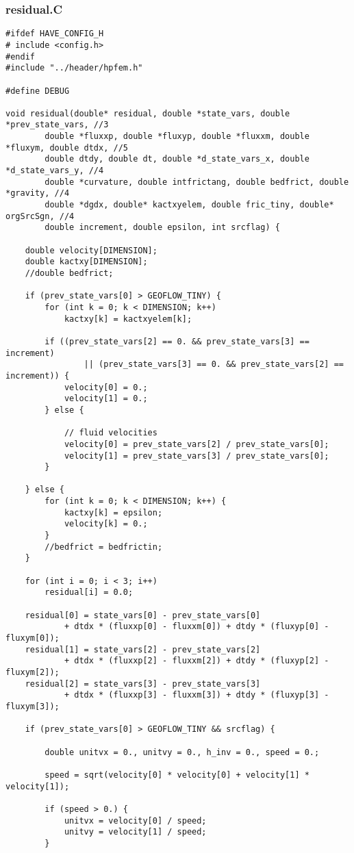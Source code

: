 \documentclass[a4paper,10pt]{article}
\begin{document}
\subsubsection{residual.C}
\begin{lstlisting}
#ifdef HAVE_CONFIG_H
# include <config.h>
#endif
#include "../header/hpfem.h"

#define	DEBUG

void residual(double* residual, double *state_vars, double *prev_state_vars, //3
		double *fluxxp, double *fluxyp, double *fluxxm, double *fluxym, double dtdx, //5
		double dtdy, double dt, double *d_state_vars_x, double *d_state_vars_y, //4
		double *curvature, double intfrictang, double bedfrict, double *gravity, //4
		double *dgdx, double* kactxyelem, double fric_tiny, double* orgSrcSgn, //4
		double increment, double epsilon, int srcflag) {

	double velocity[DIMENSION];
	double kactxy[DIMENSION];
	//double bedfrict;

	if (prev_state_vars[0] > GEOFLOW_TINY) {
		for (int k = 0; k < DIMENSION; k++)
			kactxy[k] = kactxyelem[k];

		if ((prev_state_vars[2] == 0. && prev_state_vars[3] == increment)
				|| (prev_state_vars[3] == 0. && prev_state_vars[2] == increment)) {
			velocity[0] = 0.;
			velocity[1] = 0.;
		} else {

			// fluid velocities
			velocity[0] = prev_state_vars[2] / prev_state_vars[0];
			velocity[1] = prev_state_vars[3] / prev_state_vars[0];
		}

	} else {
		for (int k = 0; k < DIMENSION; k++) {
			kactxy[k] = epsilon;
			velocity[k] = 0.;
		}
		//bedfrict = bedfrictin;
	}

	for (int i = 0; i < 3; i++)
		residual[i] = 0.0;

	residual[0] = state_vars[0] - prev_state_vars[0]
			+ dtdx * (fluxxp[0] - fluxxm[0]) + dtdy * (fluxyp[0] - fluxym[0]);
	residual[1] = state_vars[2] - prev_state_vars[2]
			+ dtdx * (fluxxp[2] - fluxxm[2]) + dtdy * (fluxyp[2] - fluxym[2]);
	residual[2] = state_vars[3] - prev_state_vars[3]
			+ dtdx * (fluxxp[3] - fluxxm[3]) + dtdy * (fluxyp[3] - fluxym[3]);

	if (prev_state_vars[0] > GEOFLOW_TINY && srcflag) {

		double unitvx = 0., unitvy = 0., h_inv = 0., speed = 0.;

		speed = sqrt(velocity[0] * velocity[0] + velocity[1] * velocity[1]);

		if (speed > 0.) {
			unitvx = velocity[0] / speed;
			unitvy = velocity[1] / speed;
		}


\end{lstlisting}
\end{document}

